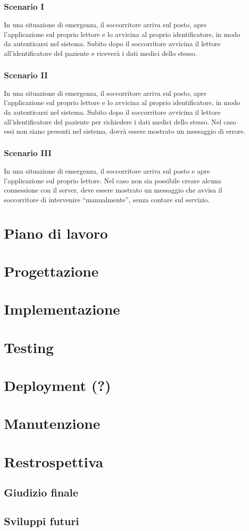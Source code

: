 \documentclass[a4paper,12pt]{report}
\begin{document}
\subsection{Scenario I}
In una situazione di emergenza, il soccorritore arriva sul posto, apre l'applicazione sul proprio lettore e lo avvicina al proprio identificatore, in modo da autenticarsi nel sistema. Subito dopo il soccorritore avvicina il lettore all'identificatore del paziente e riceverà i dati medici dello stesso. 
\subsection{Scenario II}
In una situazione di emergenza, il soccorritore arriva sul posto, apre l'applicazione sul proprio lettore e lo avvicina al proprio identificatore, in modo da autenticarsi nel sistema. Subito dopo il soccorritore avvicina il lettore all'identificatore del paziente per richiedere i dati medici dello stesso. Nel caso essi non siano presenti nel sistema, dovrà essere mostrato un messaggio di errore.
\subsection{Scenario III} 
In una situazione di emergenza, il soccorritore arriva sul posto e apre l'applicazione sul proprio lettore. Nel caso non sia possibile creare alcuna connessione con il server, deve essere mostrato un messaggio che avvisa il soccorritore di intervenire ``manualmente'', senza contare sul servizio.



\chapter{Piano di lavoro}

\chapter{Progettazione}

\chapter{Implementazione}

\chapter{Testing} 

\chapter{Deployment (?)}

\chapter{Manutenzione}

\chapter{Restrospettiva}
\section{Giudizio finale}
\section{Sviluppi futuri}

 
\end{document}
